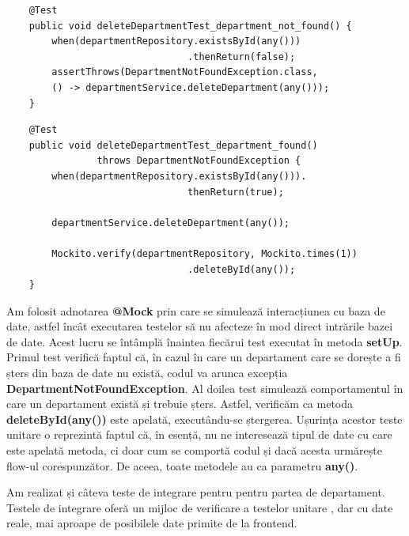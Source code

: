 \begin{center}
\begin{minipage}{0.8\textwidth}
\captionsetup{type=listing}
   \begin{lstlisting}
    @Test
    public void deleteDepartmentTest_department_not_found() {
        when(departmentRepository.existsById(any()))
                                .thenReturn(false);
        assertThrows(DepartmentNotFoundException.class,
        () -> departmentService.deleteDepartment(any()));
    }
    \end{lstlisting} 
\end{minipage}
\end{center}

\begin{center}
\begin{minipage}{0.9\textwidth}
\captionsetup{type=listing}
   \begin{lstlisting}
    @Test
    public void deleteDepartmentTest_department_found() 
                throws DepartmentNotFoundException {
        when(departmentRepository.existsById(any())).
                                thenReturn(true);

        departmentService.deleteDepartment(any());

        Mockito.verify(departmentRepository, Mockito.times(1))
                                .deleteById(any());
    }
    \end{lstlisting} 
\end{minipage}
\end{center}

Am folosit adnotarea \textbf{@Mock} prin care se simulează interacțiunea cu baza de date, astfel încât executarea testelor să nu afecteze în mod direct intrările bazei de date. Acest lucru se întâmplă înaintea fiecărui test executat în metoda \textbf{setUp}. Primul test verifică faptul că, în cazul în care un departament care se dorește a fi șters din baza de date nu există, codul va arunca excepția \textbf{DepartmentNotFoundException}. Al doilea test simulează comportamentul în care un departament există și trebuie șters. Astfel, verificăm ca metoda \textbf{deleteById(any())} este apelată, executându-se ștergerea. Ușurința acestor teste unitare o reprezintă faptul că, în esență, nu ne interesează tipul de date cu care este apelată metoda, ci doar cum se comportă codul și dacă acesta urmărește flow-ul corespunzător. De aceea, toate metodele au ca parametru \textbf{any()}.

Am realizat și câteva teste de integrare pentru pentru partea de departament. Testele de integrare oferă un mijloc de verificare a testelor unitare \cite{citation8}, dar cu date reale, mai aproape de posibilele date primite de la frontend.

